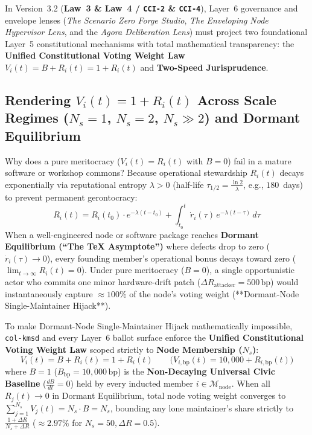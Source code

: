 In Version~3.2 (\textbf{Law~3 \& Law~4 / \texttt{CCI-2} \& \texttt{CCI-4}}), Layer~6 governance and envelope lenses (\textit{The Scenario Zero Forge Studio}, \textit{The Enveloping Node Hypervisor Lens}, and the \textit{Agora Deliberation Lens}) must project two foundational Layer~5 constitutional mechanisms with total mathematical transparency: the \textbf{Unified Constitutional Voting Weight Law} $V_i(t) = B + R_i(t) = 1 + R_i(t)$ and \textbf{Two-Speed Jurisprudence}.

\subsection{Rendering $V_i(t) = 1 + R_i(t)$ Across Scale Regimes ($N_s=1$, $N_s=2$, $N_s \gg 2$) and Dormant Equilibrium}

Why does a pure meritocracy ($V_i(t) = R_i(t)$ with $B = 0$) fail in a mature software or workshop commons? Because operational stewardship $R_i(t)$ decays exponentially via reputational entropy $\lambda > 0$ (half-life $\tau_{1/2} = \frac{\ln 2}{\lambda}$, e.g., $180$~days) to prevent permanent gerontocracy:
\begin{equation}
    R_i(t) = R_i(t_0)\cdot e^{-\lambda(t-t_0)} + \int_{t_0}^{t} \dot{r}_i(\tau)\,e^{-\lambda(t-\tau)}\,d\tau
\end{equation}
When a well-engineered node or software package reaches \textbf{Dormant Equilibrium (``The \TeX{} Asymptote'')} where defects drop to zero ($\dot{r}_i(\tau) \to 0$), every founding member's operational bonus decays toward zero ($\lim_{t \to \infty} R_i(t) = 0$). Under pure meritocracy ($B=0$), a single opportunistic actor who commits one minor hardware-drift patch ($\Delta R_{\mathrm{attacker}} = 500\,\mathrm{bp}$) would instantaneously capture $\approx 100\%$ of the node's voting weight (**Dormant-Node Single-Maintainer Hijack**).

To make Dormant-Node Single-Maintainer Hijack mathematically impossible, \texttt{col-kmsd} and every Layer~6 ballot surface enforce the \textbf{Unified Constitutional Voting Weight Law} scoped strictly to \textbf{Node Membership ($N_s$)}:
\begin{equation}
    V_i(t) = B + R_i(t) = 1 + R_i(t) \qquad \bigl(V_{i,\mathrm{bp}}(t) = 10{,}000 + R_{i,\mathrm{bp}}(t)\bigr)
    \label{eq:ch8-voting-law}
\end{equation}
where $B = 1$ ($B_{\mathrm{bp}} = 10{,}000\,\mathrm{bp}$) is the \textbf{Non-Decaying Universal Civic Baseline} ($\frac{dB}{dt} = 0$) held by every inducted member $i \in \mathcal{M}_{\mathrm{node}}$. When all $R_j(t) \to 0$ in Dormant Equilibrium, total node voting weight converges to $\sum_{j=1}^{N_s} V_j(t) = N_s \cdot B = N_s$, bounding any lone maintainer's share strictly to $\frac{1 + \Delta R}{N_s + \Delta R}$ ($\approx 2.97\%$ for $N_s = 50, \Delta R = 0.5$).

